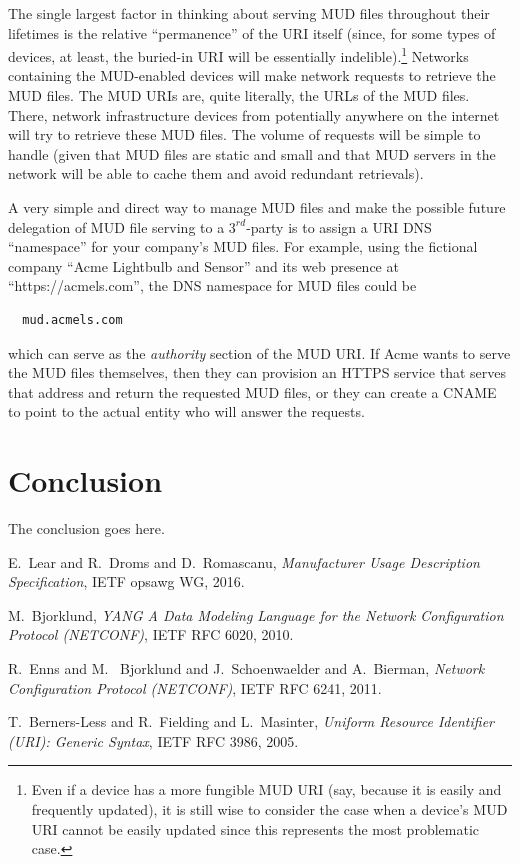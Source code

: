 \documentclass[conference]{IEEEtran}
\begin{document}
The single largest factor in thinking about serving MUD files
throughout their lifetimes is the relative ``permanence'' of the URI
itself (since, for some types of devices, at least, the buried-in URI
will be essentially indelible).\footnote{Even if a device has a more
  fungible MUD URI (say, because it is easily and frequently updated),
  it is still wise to consider the case when a device's MUD URI cannot
  be easily updated since this represents the most problematic case.}
Networks containing the MUD-enabled devices will make network requests
to retrieve the MUD files.  The MUD URIs are, quite literally, the
URLs of the MUD files.  There, network infrastructure devices from
potentially anywhere on the internet will try to retrieve these MUD
files.  The volume of requests will be simple to handle (given that
MUD files are static and small and that MUD servers in the network
will be able to cache them and avoid redundant retrievals).

A very simple and direct way to manage MUD files and make the possible
future delegation of MUD file serving to a $3^{rd}$-party
is to assign a URI DNS ``namespace'' for your company's MUD files.
For example, using the fictional company ``Acme Lightbulb and Sensor''
and its web presence at ``https://acmels.com'', the DNS namespace for
MUD files could be

{\ttfamily\scriptsize
\begin{verbatim}
  mud.acmels.com
\end{verbatim}
}

\noindent which can serve as the {\em authority} section of the MUD
URI.  If Acme wants to serve the MUD files themselves, then they can
provision an HTTPS service that serves that address and return the
requested MUD files, or they can create a CNAME to point to the actual
entity who will answer the requests.

\section{Conclusion}
The conclusion goes here.

\begin{thebibliography}{1}

  E.~Lear and R.~Droms and D.~Romascanu, \emph{Manufacturer Usage
    Description Specification}, IETF opsawg WG, 2016.

  M.~Bjorklund, \emph{YANG \- A Data Modeling Language for the Network
  Configuration Protocol (NETCONF)}, IETF RFC 6020, 2010.

 R.~Enns and M.~ Bjorklund and
  J.~Schoenwaelder and A.~Bierman, \emph{Network Configuration
    Protocol (NETCONF)}, IETF RFC 6241, 2011.

 T.~Berners-Less and R.~Fielding and
  L.~Masinter, \emph{Uniform Resource Identifier (URI): Generic
    Syntax}, IETF RFC 3986, 2005.

\end{thebibliography}
\end{document}
